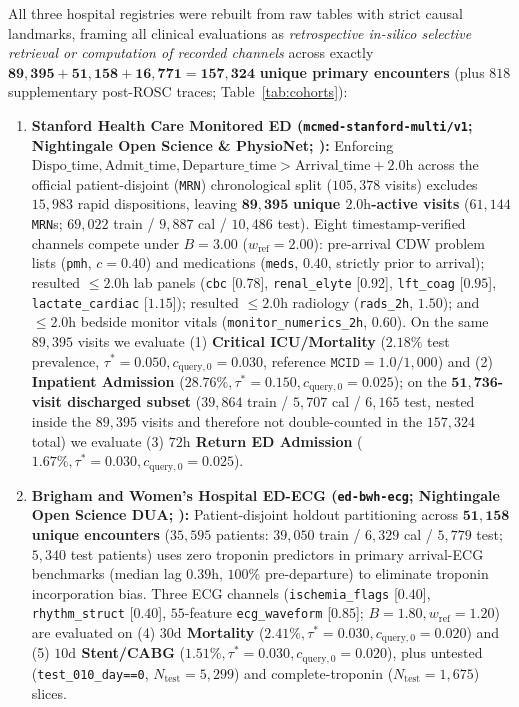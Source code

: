 \documentclass[11pt]{article}
\theoremstyle{remark}
\begin{document}
All three hospital registries were rebuilt from raw tables with strict causal landmarks, framing all clinical evaluations as \emph{retrospective in-silico selective retrieval or computation of recorded channels} across exactly $\mathbf{89{,}395 + 51{,}158 + 16{,}771 = 157{,}324}$ \textbf{unique primary encounters} (plus $818$ supplementary post-ROSC traces; Table~\ref{tab:cohorts}):
\begin{enumerate}
  \item \textbf{Stanford Health Care Monitored ED (\texttt{mcmed-stanford-multi/v1}; Nightingale Open Science \& PhysioNet; \citealp{kansal2025mcmed,goldberger2000physionet}):} Enforcing $\text{Dispo\_time}, \text{Admit\_time}, \text{Departure\_time} > \text{Arrival\_time} + 2.0\text{h}$ across the official patient-disjoint (\texttt{MRN}) chronological split ($105{,}378$ visits) excludes $15{,}983$ rapid dispositions, leaving $\mathbf{89{,}395}$ \textbf{unique $2.0\text{h}$-active visits} ($61{,}144$ \texttt{MRN}s; $69{,}022$ train / $9{,}887$ cal / $10{,}486$ test). Eight timestamp-verified channels compete under $B=3.00$ ($w_{\text{ref}}=2.00$): pre-arrival CDW problem lists (\texttt{pmh}, $c=0.40$) and medications (\texttt{meds}, $0.40$, strictly prior to arrival); resulted $\le 2.0\text{h}$ lab panels (\texttt{cbc} [$0.78$], \texttt{renal\_elyte} [$0.92$], \texttt{lft\_coag} [$0.95$], \texttt{lactate\_cardiac} [$1.15$]); resulted $\le 2.0\text{h}$ radiology (\texttt{rads\_2h}, $1.50$); and $\le 2.0\text{h}$ bedside monitor vitals (\texttt{monitor\_numerics\_2h}, $0.60$). On the same $89{,}395$ visits we evaluate (1) \textbf{Critical ICU/Mortality} ($2.18\%$ test prevalence, $\tau^*=0.050, c_{\text{query},0}=0.030$, reference $\texttt{MCID}=1.0/1{,}000$) and (2) \textbf{Inpatient Admission} ($28.76\%, \tau^*=0.150, c_{\text{query},0}=0.025$); on the $\mathbf{51{,}736}$\textbf{-visit discharged subset} ($39{,}864$ train / $5{,}707$ cal / $6{,}165$ test, nested inside the $89{,}395$ visits and therefore not double-counted in the $157{,}324$ total) we evaluate (3) \textbf{$72\text{h}$ Return ED Admission} ($1.67\%, \tau^*=0.030, c_{\text{query},0}=0.025$).
  \item \textbf{Brigham and Women's Hospital ED-ECG (\texttt{ed-bwh-ecg}; Nightingale Open Science DUA; \citealp{mullainathan2022diagnosing}):} Patient-disjoint holdout partitioning across $\mathbf{51{,}158}$ \textbf{unique encounters} ($35{,}595$ patients: $39{,}050$ train / $6{,}329$ cal / $5{,}779$ test; $5{,}340$ test patients) uses zero troponin predictors in primary arrival-ECG benchmarks (median lag $0.39\text{h}$, $100\%$ pre-departure) to eliminate troponin incorporation bias. Three ECG channels (\texttt{ischemia\_flags} [$0.40$], \texttt{rhythm\_struct} [$0.40$], $55$-feature \texttt{ecg\_waveform} [$0.85$]; $B=1.80, w_{\text{ref}}=1.20$) are evaluated on (4) \textbf{$30\text{d}$ Mortality} ($2.41\%, \tau^*=0.030, c_{\text{query},0}=0.020$) and (5) \textbf{$10\text{d}$ Stent/CABG} ($1.51\%, \tau^*=0.030, c_{\text{query},0}=0.020$), plus untested (\texttt{test\_010\_day==0}, $N_{\text{test}}=5{,}299$) and complete-troponin ($N_{\text{test}}=1{,}675$) slices.

\end{enumerate}
\end{document}

